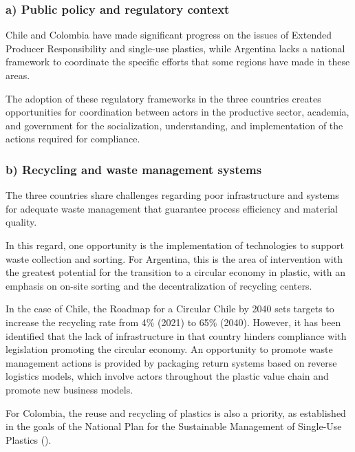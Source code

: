 \documentclass[
  12pt,
  oneside]{book}
\begin{document}
\subsubsection{a) Public policy and regulatory
context}\label{a-public-policy-and-regulatory-context}

Chile and Colombia have made significant progress on the issues of
Extended Producer Responsibility and single-use plastics, while
Argentina lacks a national framework to coordinate the specific efforts
that some regions have made in these areas.

The adoption of these regulatory frameworks in the three countries
creates opportunities for coordination between actors in the productive
sector, academia, and government for the socialization, understanding,
and implementation of the actions required for compliance.

\subsubsection{b) Recycling and waste management
systems}\label{b-recycling-and-waste-management-systems}

The three countries share challenges regarding poor infrastructure and
systems for adequate waste management that guarantee process efficiency
and material quality.

In this regard, one opportunity is the implementation of technologies to
support waste collection and sorting. For Argentina, this is the area of
intervention with the greatest potential for the transition to a
circular economy in plastic, with an emphasis on on-site sorting and the
decentralization of recycling centers.

In the case of Chile, the Roadmap for a Circular Chile by 2040 sets
targets to increase the recycling rate from 4\% (2021) to 65\% (2040).
However, it has been identified that the lack of infrastructure in that
country hinders compliance with legislation promoting the circular
economy. An opportunity to promote waste management actions is provided
by packaging return systems based on reverse logistics models, which
involve actors throughout the plastic value chain and promote new
business models.

For Colombia, the reuse and recycling of plastics is also a priority, as
established in the goals of the National Plan for the Sustainable
Management of Single-Use Plastics ().
\end{document}
